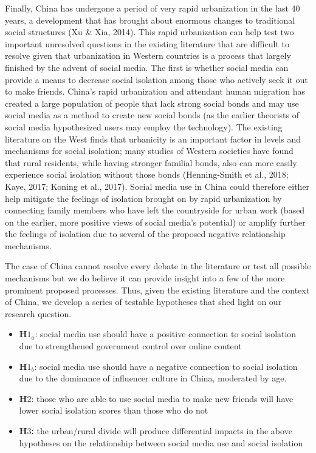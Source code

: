 \documentclass[]{interact}
\theoremstyle{plain}%
\theoremstyle{definition}
\theoremstyle{remark}
\begin{document}
Finally, China has undergone a period of very rapid urbanization in the
last 40 years, a development that has brought about enormous changes to
traditional social structures (Xu \& Xia, 2014). This rapid urbanization
can help test two important unresolved questions in the existing
literature that are difficult to resolve given that urbanization in
Western countries is a process that largely finished by the advent of
social media. The first is whether social media can provide a means to
decrease social isolation among those who actively seek it out to make
friends. China's rapid urbanization and attendant human migration has
created a large population of people that lack strong social bonds and
may use social media as a method to create new social bonds (as the
earlier theorists of social media hypothesized users may employ the
technology). The existing literature on the West finds that urbanicity
is an important factor in levels and mechanisms for social isolation;
many studies of Western societies have found that rural residents, while
having stronger familial bonds, also can more easily experience social
isolation without those bonds (Henning-Smith et al., 2018; Kaye, 2017;
Koning et al., 2017). Social media use in China could therefore either
help mitigate the feelings of isolation brought on by rapid urbanization
by connecting family members who have left the countryside for urban
work (based on the earlier, more positive views of social media's
potential) or amplify further the feelings of isolation due to several
of the proposed negative relationship mechanisms.

The case of China cannot resolve every debate in the literature or test
all possible mechanisms but we do believe it can provide insight into a
few of the more prominent proposed processes. Thus, given the existing
literature and the context of China, we develop a series of testable
hypotheses that shed light on our research question.

\begin{itemize}
\item
  \textbf{H\(1_a\)}: social media use should have a positive connection
  to social isolation due to strengthened government control over online
  content
\item
  \textbf{H\(1_b\)}: social media use should have a negative connection
  to social isolation due to the dominance of influencer culture in
  China, moderated by age.
\item
  \textbf{H\(2\)}: those who are able to use social media to make new
  friends will have lower social isolation scores than those who do not
\item
  \textbf{H\(3\):} the urban/rural divide will produce differential
  impacts in the above hypotheses on the relationship between social
  media use and social isolation
\end{itemize}
\end{document}
